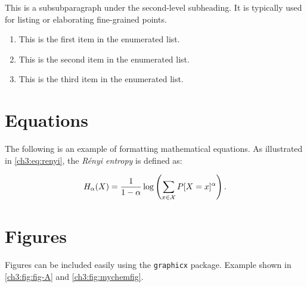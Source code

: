 \begin{subsubparagraph}
This is a subsubparagraph under the second-level subheading. It is typically used for listing or elaborating fine-grained points.
\end{subsubparagraph}

\begin{enumerate}[itemindent=\subsubparitemindent]
    \label{ch3:enum:example}
    \item This is the first item in the enumerated list.
    \item This is the second item in the enumerated list.
    \item This is the third item in the enumerated list.
\end{enumerate}

    
\section{Equations}
\begin{paragraph}
The following is an example of formatting mathematical equations. As illustrated in \autoref{ch3:eq:renyi}, the {\em R\'enyi entropy} is defined as:
\end{paragraph}

\begin{equation}
\label{ch3:eq:renyi}
H_{\alpha}(X) =
\frac{1}{1-\alpha}
\log \left(\sum_{x \in {\cal X}}P[X=x]^{\alpha} \right) .
\end{equation}

\section{Figures}
\begin{paragraph}
Figures can be included easily using the \texttt{graphicx} package. Example shown in \autoref{ch3:fig:fig-A} and \autoref{ch3:fig:mychemfig}.
\end{paragraph}

